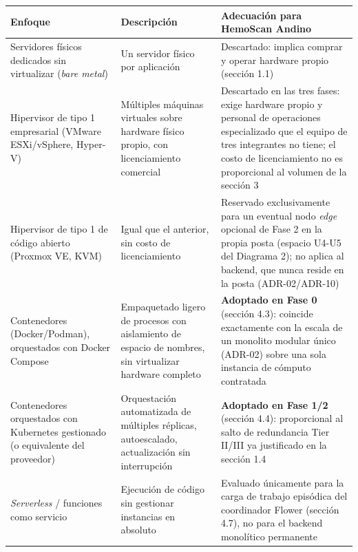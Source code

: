 \documentclass[11pt,a4paper]{article}
\begin{document}
{\small
\begin{longtable}[]{@{}
  >{\raggedright\arraybackslash}p{}
  >{\raggedright\arraybackslash}p{}
  >{\raggedright\arraybackslash}p{}@{}}
\toprule\noalign{}
\begin{minipage}[b]{\linewidth}\raggedright
Enfoque
\end{minipage} & \begin{minipage}[b]{\linewidth}\raggedright
Descripción
\end{minipage} & \begin{minipage}[b]{\linewidth}\raggedright
Adecuación para HemoScan Andino
\end{minipage} \\
\midrule\noalign{}
\endhead
\bottomrule\noalign{}
\endlastfoot
Servidores físicos dedicados sin virtualizar (\emph{bare metal}) & Un servidor físico por aplicación & Descartado: implica comprar y operar hardware propio (sección 1.1) \\
Hipervisor de tipo 1 empresarial (VMware ESXi/vSphere, Hyper-V) & Múltiples máquinas virtuales sobre hardware físico propio, con licenciamiento comercial & Descartado en las tres fases: exige hardware propio y personal de operaciones especializado que el equipo de tres integrantes no tiene; el costo de licenciamiento no es proporcional al volumen de la sección 3 \\
Hipervisor de tipo 1 de código abierto (Proxmox VE, KVM) & Igual que el anterior, sin costo de licenciamiento & Reservado exclusivamente para un eventual nodo \emph{edge} opcional de Fase 2 en la propia posta (espacio U4-U5 del Diagrama 2); no aplica al backend, que nunca reside en la posta (ADR-02/ADR-10) \\
Contenedores (Docker/Podman), orquestados con Docker Compose & Empaquetado ligero de procesos con aislamiento de espacio de nombres, sin virtualizar hardware completo & \textbf{Adoptado en Fase 0} (sección 4.3): coincide exactamente con la escala de un monolito modular único (ADR-02) sobre una sola instancia de cómputo contratada \\
Contenedores orquestados con Kubernetes gestionado (o equivalente del proveedor) & Orquestación automatizada de múltiples réplicas, autoescalado, actualización sin interrupción & \textbf{Adoptado en Fase 1/2} (sección 4.4): proporcional al salto de redundancia Tier II/III ya justificado en la sección 1.4 \\
\emph{Serverless} / funciones como servicio & Ejecución de código sin gestionar instancias en absoluto & Evaluado únicamente para la carga de trabajo episódica del coordinador Flower (sección 4.7), no para el backend monolítico permanente \\
\end{longtable}
}
\end{document}
